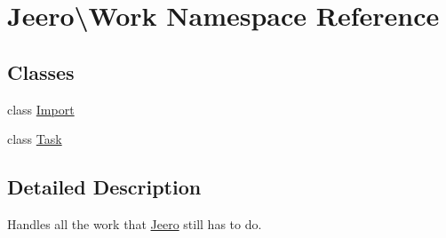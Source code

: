 \hypertarget{namespaceJeero_1_1Work}{}\section{Jeero\textbackslash{}Work Namespace Reference}
\label{namespaceJeero_1_1Work}
\subsection*{Classes}
\begin{DoxyCompactItemize}
\item 
class \hyperlink{classJeero_1_1Work_1_1Import}{Import}
\item 
class \hyperlink{classJeero_1_1Work_1_1Task}{Task}
\end{DoxyCompactItemize}


\subsection{Detailed Description}
Handles all the work that \hyperlink{namespaceJeero}{Jeero} still has to do. 